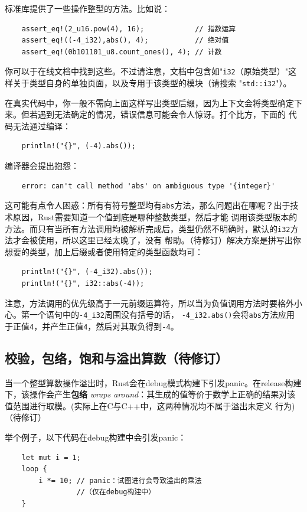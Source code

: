 \smallskip
标准库提供了一些操作整型的方法。比如说：
\begin{verbatim}
    assert_eq!(2_u16.pow(4), 16);            // 指数运算
    assert_eq!((-4_i32),abs(), 4);           // 绝对值
    assert_eq!(0b101101_u8.count_ones(), 4); // 计数
\end{verbatim}

\smallskip
你可以于在线文档中找到这些。不过请注意，文档中包含如"\texttt{i32}（原始类型）"这样关于类型自身的单独页面，以及专用于该类型的模块（请搜索
"\texttt{std::i32}"）。

\medskip
在真实代码中，你一般不需向上面这样写出类型后缀，因为上下文会将类型确定下来。但若遇到无法确定的情况，错误信息可能会令人惊讶。打个比方，下面的
代码无法通过编译：
\begin{verbatim}
    println!("{}", (-4).abs());
\end{verbatim}

\smallskip
编译器会提出抱怨：
\begin{verbatim}
    error: can't call method 'abs' on ambiguous type '{integer}'
\end{verbatim}

\smallskip
这可能有点令人困惑：所有有符号整型均有\texttt{abs}方法，那么问题出在哪呢？出于技术原因，Rust需要知道一个值到底是哪种整数类型，然后才能
调用该类型版本的方法。而只有当所有方法调用均被解析完成后，类型仍然不明确时，默认的\texttt{i32}方法才会被使用，所以这里已经太晚了，没有
帮助。（待修订）解决方案是拼写出你想要的类型，加上后缀或者使用特定的类型函数均可：
\begin{verbatim}
    println!("{}", (-4_i32).abs());
    println!("{}", i32::abs(-4));
\end{verbatim}

\smallskip
注意，方法调用的优先级高于一元前缀运算符，所以当为负值调用方法时要格外小心。第一个语句中的\texttt{-4\_i32}周围没有括号的话，
\texttt{-4\_i32.abs()}会将\texttt{abs}方法应用于正值\texttt{4}，并产生正值\texttt{4}，然后对其取负得到\texttt{-4}。

\medskip
\subsection{校验，包络，饱和与溢出算数（待修订）}
当一个整型算数操作溢出时，Rust会在debug模式构建下引发panic。在release构建下，该操作会产生\textbf{包络}
\textit{wraps around}：其生成的值等价于数学上正确的结果对该值范围进行取模。(实际上在C与C++中，这两种情况均不属于溢出未定义
行为)（待修订）

\medskip
举个例子，以下代码在debug构建中会引发panic：
\begin{verbatim}
    let mut i = 1;
    loop {
        i *= 10; // panic：试图进行会导致溢出的乘法
                 //（仅在debug构建中）
    }
\end{verbatim}

